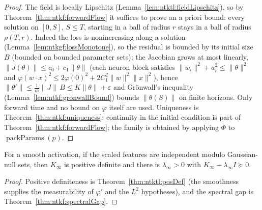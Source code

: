 \begin{proof}
  \leanok
The field is locally Lipschitz (Lemma~\ref{lem:ntktl:fieldLipschitz}), so by Theorem~\ref{thm:ntkf:forwardFlow} it suffices to prove an a priori bound: every solution on $[0,S]$, $S\le T$, starting in a ball of radius $r$ stays in a ball of radius $\rho(T,r)$. Indeed the loss is nonincreasing along a solution (Lemma~\ref{lem:ntkgf:lossMonotone}), so the residual is bounded by its
initial size $B$ (bounded on bounded parameter sets); the Jacobian grows at most linearly, $\|J(\theta)\|\le c_0+c_1\|\theta\|$ (each neuron block satisfies $\|w_i\|^2+a_i^2\le\|\theta\|^2$ and $\varphi(w\cdot x)^2\le2\varphi(0)^2+2C_1^2\|w\|^2\|x\|^2$), hence
$\|\theta'\|\le\frac1m\|J\|\,B\le K\|\theta\|+\varepsilon$ and Gr\"onwall's inequality (Lemma~\ref{lem:ntkf:gronwallBound}) bounds $\|\theta(S)\|$ on finite horizons. Only forward time and no bound on $\varphi$ itself are used. Uniqueness is Theorem~\ref{thm:ntkf:uniqueness};
continuity in the initial condition is part of Theorem~\ref{thm:ntkf:forwardFlow}; the family is obtained by applying $\Phi$ to $\operatorname{packParams}(p)$.
\end{proof}

\begin{theorem}\label{thm:ntktl:gapFromIndependence}
  \leanok
For a smooth activation, if the scaled features are independent modulo Gaussian-null sets, then $K_\infty$ is positive definite and there is $\lambda_\infty>0$ with $K_\infty-\lambda_\infty I\succeq0$.
\end{theorem}

\begin{proof}
  \leanok
Positive definiteness is Theorem~\ref{thm:ntktl:posDef} (the smoothness supplies the measurability of $\varphi'$ and the $L^2$ hypotheses), and the spectral gap is Theorem~\ref{thm:ntkf:spectralGap}.
\end{proof}

